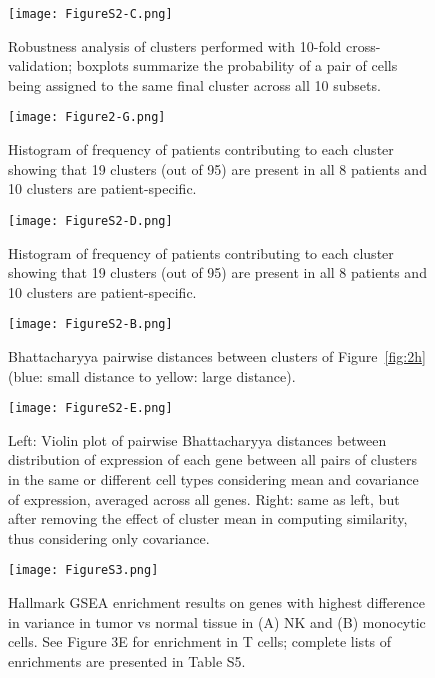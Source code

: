 \begin{figure}
\centering
\texttt{[image: FigureS2-C.png]}
\caption{Robustness analysis of clusters performed with 10-fold cross-validation; boxplots summarize the probability of a pair of cells being assigned to the same final cluster across all 10 subsets.
}
\label{fig:s2c}
\end{figure}

\begin{figure}
\centering
\texttt{[image: Figure2-G.png]}
\caption{Histogram of frequency of patients contributing to each cluster showing that 19 clusters (out of 95) are present in all 8 patients and 10 clusters are patient-specific.
}
\label{fig:2g}
\end{figure}

\begin{figure}
\centering
\texttt{[image: FigureS2-D.png]}
\caption{Histogram of frequency of patients contributing to each cluster showing that 19 clusters (out of 95) are present in all 8 patients and 10 clusters are patient-specific.
}
\label{fig:s2d}
\end{figure}

\begin{figure}
\centering
\texttt{[image: FigureS2-B.png]}
\caption{Bhattacharyya pairwise distances between clusters of Figure~\ref{fig:2h} (blue: small distance to yellow: large distance).
}
\label{fig:s2b}
\end{figure}


\begin{figure}
\centering
\texttt{[image: FigureS2-E.png]}
\caption{Left: Violin plot of pairwise Bhattacharyya distances between distribution of expression of each gene between all pairs of clusters in the same or different cell types considering mean and covariance of expression, averaged across all genes.
Right: same as left, but after removing the effect of cluster mean in computing similarity, thus considering only covariance.
}
\label{fig:s2e}
\end{figure}

\begin{figure}
\centering
\texttt{[image: FigureS3.png]}
\caption{Hallmark GSEA enrichment results on genes with highest difference in variance in tumor vs normal tissue in (A) NK and (B) monocytic cells. See Figure 3E for enrichment in T cells; complete lists of enrichments are presented in Table S5.
}
\label{fig:s3}
\end{figure}


